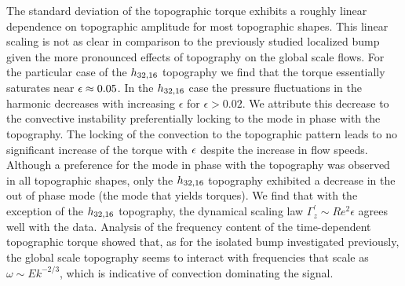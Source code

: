 
The standard deviation of the topographic torque exhibits a roughly linear dependence on topographic amplitude for most topographic shapes. 
This linear scaling is not as clear in comparison to the previously studied localized bump given the more pronounced effects of topography on the global scale flows. 
For the particular case of the $h_{32,16}$ topography we find that the torque essentially saturates near $\epsilon \approx 0.05$. 
In the $h_{32,16}$ case the pressure fluctuations in the  harmonic decreases with increasing $\epsilon$ for $\epsilon >0.02.$ We attribute this decrease to the convective instability preferentially locking to the mode in phase with the topography. 
The locking of the convection to the topographic pattern leads to no significant increase of the torque with $\epsilon$ despite the increase in flow speeds. 
Although a preference for the mode in phase with the topography was observed in all topographic shapes, only the $h_{32,16}$ topography exhibited a decrease in the out of phase mode (the mode that yields torques).
We find that with the exception of the $h_{32,16}$ topography, the dynamical scaling law $\Gamma_{z}^{\prime}\sim Re^{2}\epsilon$ agrees well with the data. 
Analysis of the frequency content of the time-dependent topographic torque showed that, as for the isolated bump investigated previously, the global scale topography seems to interact with frequencies that scale as $\omega\sim Ek^{-2/3}$, which is indicative of convection dominating the signal.

